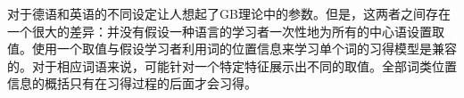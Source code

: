 对于德语和英语\initialvc 的不同设定让人想起了GB理论中的参数。但是，这两者之间存在一个很大的差异：并没有假设一种语言的学习者一次性地为所有的中心语设置\initialvc 取值。使用一个\initialvc 取值与假设学习者利用词的位置信息来学习单个词的习得模型是兼容的。对于相应词语来说，可能针对一个特定特征展示出不同的取值。全部词类位置信息的概括只有在习得过程的后面才会习得。

